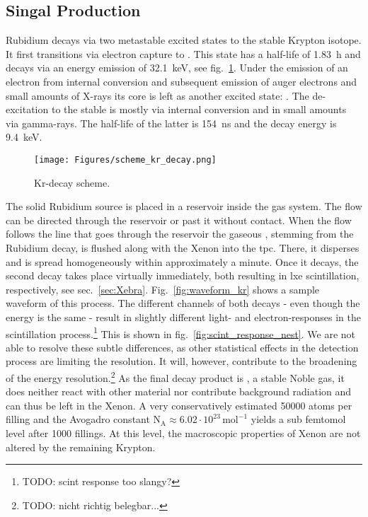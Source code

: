 
\FloatBarrier
\subsection{ Singal Production}
\label{ssec:source}
\FloatBarrier


Rubidium  decays via two metastable excited states to the stable  Krypton isotope.
It first transitions via electron capture to .
This state has a half-life of \SI{1.83}{\hour} and decays via an energy emission of \SI{32.1}{\kilo\electronvolt}, see fig.~\ref{fig:scheme_kr}.
Under the emission of an electron from internal conversion and subsequent emission of auger electrons and small amounts of X-rays its core is left as another excited state: .
The de-excitation to the stable  is mostly via internal conversion and in small amounts via gamma-rays.
The half-life of the latter is \SI{154}{\nano\s} and the decay energy is \SI{9.4}{\kilo\electronvolt}.


\begin{figure}
    \centering
    \texttt{[image: Figures/scheme\_kr\_decay.png]}  %
    \caption[Decay Scheme Krypton]{
        Kr-decay scheme\cite{kr_scheme}.
    }
    \label{fig:scheme_kr}
\end{figure}

The solid Rubidium source is placed in a reservoir inside the gas system.
The flow can be directed through the reservoir or past it without contact.
When the flow follows the line that goes through the reservoir the gaseous , stemming from the Rubidium decay, is flushed along with the Xenon into the \gls{tpc}.
There, it disperses and is spread homogeneously within approximately a minute.
Once it decays, the second decay takes place virtually immediately, both resulting in \gls{lxe} scintillation, respectively, see sec.~\ref{sec:Xebra}.
Fig.~\ref{fig:waveform_kr} shows a sample waveform of this process.
The different channels of both decays - even though the energy is the same - result in slightly different light- and electron-responses in the scintillation process.\footnote{TODO: scint response too slangy?}
This is shown in fig.~\ref{fig:scint_response_nest}.
We are not able to resolve these subtle differences, as other statistical effects in the detection process are limiting the resolution.
It will, however, contribute to the broadening of the energy resolution.\footnote{TODO: nicht richtig belegbar...}
As the final decay product is , a stable Noble gas, it does neither react with other material nor contribute background radiation and can thus be left in the Xenon.
A very conservatively estimated \SI{50000}{} atoms per filling and the Avogadro constant $ \mathrm{N}_\mathrm{A} \approx 6.02\cdot10^{23}\,\mathrm{mol}^{-1} $ yields a sub femtomol level after 1000 fillings.
At this level, the macroscopic properties of Xenon are not altered by the remaining Krypton.


